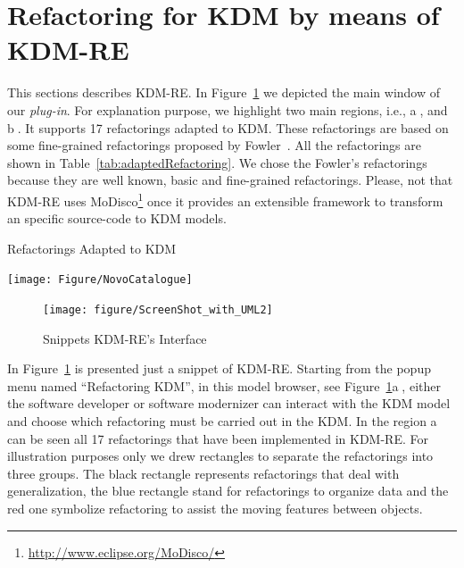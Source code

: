 \documentclass[12pt]{article}
\let\cite=\citep
\begin{document}

\section{Refactoring for KDM by means of KDM-RE}\label{sec:refactoring_kdm_kdm_re}

This sections describes KDM-RE. 
In Figure~\ref{fig:interface} we depicted the main window of our \textit{plug-in}. 
For explanation purpose, we highlight two main regions, i.e., \textcircled{a}, and \textcircled{b}.
It supports 17 refactorings adapted to KDM. These refactorings are based on some fine-grained refactorings proposed by Fowler~\cite{refactImpro}. All the refactorings are shown in Table~\ref{tab:adaptedRefactoring}. We chose the Fowler's refactorings because they are well known, basic and fine-grained refactorings. Please, not that KDM-RE uses MoDisco\footnote{\url{http://www.eclipse.org/MoDisco/}} once it provides an extensible framework to transform an specific source-code to KDM models.
%
%
\begin{table}[!h]
\caption{Refactorings Adapted to KDM}
\label{tab:adaptedRefactoring}
\centering
  \texttt{[image: Figure/NovoCatalogue]}
\end{table}
%
\begin{figure}[!ht]
\centering
  \texttt{[image: figure/ScreenShot\_with\_UML2]}
\caption{Snippets KDM-RE's Interface}
\label{fig:interface}
\end{figure}
%
In Figure~\ref{fig:interface} is presented just a snippet of KDM-RE. Starting from the popup menu named ``Refactoring KDM'', in this model browser, see Figure~\ref{fig:interface}\textcircled{a}, either the software developer or software modernizer can interact with the KDM model and choose which refactoring must be carried out in the KDM.
%
In the region \textcircled{a} can be seen all 17 refactorings that have been implemented in KDM-RE. 
For illustration purposes only we drew rectangles to separate the refactorings into three groups. 
The black rectangle represents refactorings that deal with generalization, the blue rectangle stand for refactorings to organize data and the red one symbolize refactoring to assist the moving features between objects.
\end{document}

